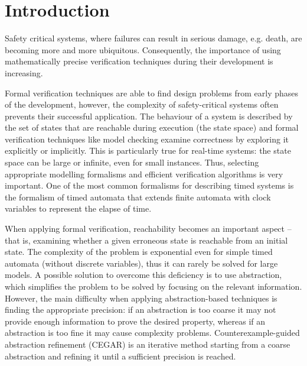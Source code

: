 \chapter{Introduction}
\label{chap:introduction}

Safety critical systems, where failures can result in serious damage, e.g. death, are becoming more and more ubiquitous. Consequently, the importance of using mathematically precise verification techniques during their development is increasing.  

Formal verification techniques are able to find design problems from early phases of the development, however, the complexity of safety-critical systems often prevents their successful application. The behaviour of a system is described by the set of states that are reachable during execution (the state space) and formal verification techniques like model checking examine correctness by exploring it explicitly or implicitly. This is particularly true for real-time systems: the state space can be large or infinite, even for small instances. Thus, selecting appropriate modelling formalisms and efficient verification algorithms is very important. One of the most common formalisms for describing timed systems is the formalism of timed automata that extends finite automata with clock variables to represent the elapse of time.

When applying formal verification, reachability becomes an important aspect – that is, examining whether a given erroneous state is reachable from an initial state. The complexity of the problem is exponential even for simple timed automata (without discrete variables), thus it can rarely be solved for large models. A possible solution to overcome this deficiency is to use abstraction, which simplifies the problem to be solved by focusing on the relevant information. However, the main difficulty when applying abstraction-based techniques is finding the appropriate precision: if an abstraction is too coarse it may not provide enough information to prove the desired property, whereas if an abstraction is too fine it may cause complexity problems. Counterexample-guided abstraction refinement (CEGAR) is an iterative method starting from a coarse abstraction and refining it until a sufficient precision is reached.


